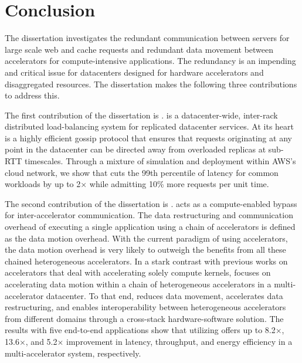 \chapter{Conclusion}
\label{conclusion:chap}
%
The dissertation investigates the redundant communication between servers for large scale web and cache requests and redundant data movement between accelerators for compute-intensive applications.
%
The redundancy is an impending and critical issue for datacenters designed for hardware accelerators and disaggregated resources.
% 
The dissertation makes the following three contributions to address this.


The first contribution of the dissertation is \daronpon. 
%
\daronpon is a datacenter-wide, inter-rack distributed load-balancing system for replicated datacenter services.  
%
At its heart \daronpon is a highly efficient gossip protocol that ensures that requests originating at any point in the datacenter can be directed away from overloaded replicas at sub-RTT timescales.
%
Through a mixture of simulation and deployment within AWS's cloud network, we show that \daronpon cuts the 99th percentile of latency for common workloads by up to 2$\times$ while admitting 10\% more requests
per unit time. 

The second contribution of the dissertation is \dmx. 
%
\dmx acts as a compute-enabled bypass for inter-accelerator communication. 
%
The data restructuring and communication overhead of executing a single application using a chain of accelerators is defined as the data motion overhead.
%
With the current paradigm of using accelerators, the data motion overhead is very likely to outweigh the benefits from all these chained heterogeneous accelerators.
%
In a stark contrast with previous works on accelerators that deal with accelerating solely compute kernels, \dmx focuses on accelerating data motion within a chain of heterogeneous accelerators in a multi-accelerator datacenter.
%
To that end, \dmx reduces data movement, accelerates data restructuring, and enables interoperability between heterogeneous accelerators from different domains through a cross-stack hardware-software solution. 
%
The results with five end-to-end applications show that utilizing \dmx offers up to 8.2$\times$, 13.6$\times$, and 5.2$\times$ improvement in latency, throughput, and energy efficiency in a multi-accelerator system, respectively.

